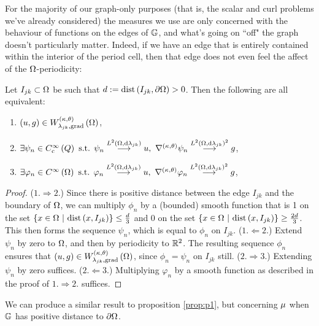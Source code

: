 \documentclass[11pt]{report}
\newcommand{\csmooth}[1]{C^{\infty}_{\mathrm{c}}\bracs{#1}}
\begin{document}
For the majority of our graph-only purposes (that is, the scalar and curl problems we've already considered) the measures we use are only concerned with the behaviour of functions on the edges of $\mathbb{G}$, and what's going on ``off" the graph doesn't particularly matter.
Indeed, if we have an edge that is entirely contained within the interior of the period cell, then that edge does not even feel the affect of the $\Omega$-periodicity:
\begin{prop} \label{prop:p1}
	Let $I_{jk}\subset\Omega$ be such that $d := \mathrm{dist}\left( I_{jk},\partial\Omega \right) >0$.
	Then the following are all equivalent:
	\begin{enumerate}
		\item $\left( u,g \right)\in W^{\left( \kappa, \theta \right)}_{\lambda_{jk}, \mathrm{grad}}\left( \Omega \right)$,
		\item $\exists\psi_n\in\csmooth{Q} \text{ s.t. } \psi_n\lconv{\ltwo{\ddom}{\lambda_{jk}}}u, \ \ktgrad\psi_n\lconv{\ltwo{\ddom}{\lambda_{jk}}^2}g$,
		\item $\exists\varphi_n\in\smooth{\ddom} \text{ s.t. } \varphi_n\lconv{\ltwo{\ddom}{\lambda_{jk}}}u, \ \ktgrad\varphi_n\lconv{\ltwo{\ddom}{\lambda_{jk}}^2}g$,
	\end{enumerate}
\end{prop}
\begin{proof}
	($1. \Rightarrow 2.$) Since there is positive distance between the edge $I_{jk}$ and the boundary of $\Omega$, we can multiply $\phi_n$ by a (bounded) smooth function that is 1 on the set $\left\{ x\in\Omega \ \middle\vert \  \mathrm{dist}\left( x,I_{jk} \right) \right\}\leq\frac{d}{3}$ and 0 on the set $\left\{ x\in\Omega \ \middle\vert \  \mathrm{dist}\left( x,I_{jk} \right) \right\}\geq\frac{2d}{3}$.
	This then forms the sequence $\psi_n$, which is equal to $\phi_n$ on $I_{jk}$. \newline
	($1. \Leftarrow 2.$) Extend $\psi_n$ by zero to $\Omega$, and then by periodicity to $\mathbb{R}^2$.
	The resulting sequence $\phi_n$ ensures that $\left( u,g \right)\in W^{\left( \kappa, \theta \right)}_{\lambda_{jk}, \mathrm{grad}}\left( \Omega \right)$, since $\phi_n = \psi_n$ on $I_{jk}$ still. \newline
	($2. \Rightarrow 3.$) Extending $\psi_n$ by zero suffices. \newline
	($2. \Leftarrow 3.$) Multiplying $\varphi_n$ by a smooth function as described in the proof of $1. \Rightarrow 2.$ suffices.
\end{proof}
We can produce a similar result to proposition \ref{prop:p1}, but concerning $\mu$ when $\mathbb{G}$ has positive distance to $\partial\Omega$.
\end{document}

